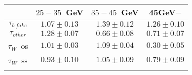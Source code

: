\centering
\begin{tabular}{cccc} \toprule\toprule
 & $25-35$~GeV & $35-45$~GeV & 45GeV$-$\\\midrule
$\tau_{b~fake}$ & $1.07\pm0.13$ & $1.39\pm0.12$ & $1.26\pm0.10$\\
$\tau_{other}$ & $1.28\pm0.07$ & $0.66\pm0.08$ & $0.71\pm0.07$\\
$\tau_{W}$~os & $1.01\pm0.03$ & $1.09\pm0.04$ & $0.30\pm0.05$\\
$\tau_{W}$~ss & $0.93\pm0.10$ & $1.05\pm0.09$ & $0.79\pm0.09$\\
\bottomrule\bottomrule\\
\end{tabular}
